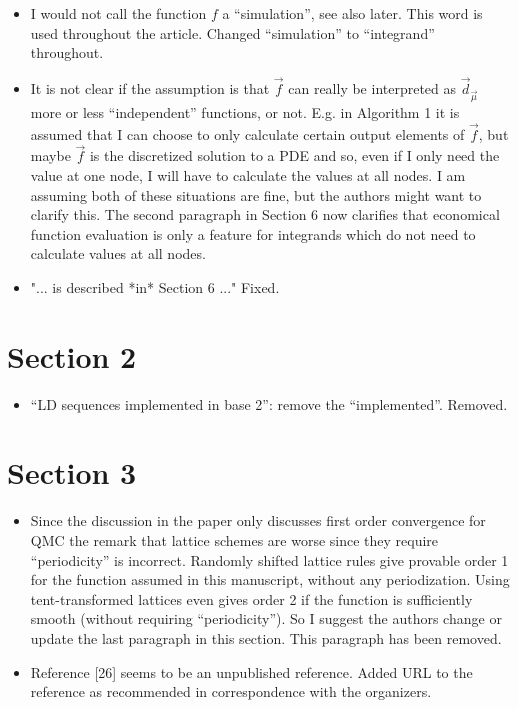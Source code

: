 \documentclass{article}[12pt]
\newcommand{\Referee}[1]{{\color{blue} #1 \newline}}
\begin{document}
\begin{itemize}
    \item \Referee{I would not call the function $f$ a ``simulation'', see also later. This word is used throughout the article.}Changed ``simulation'' to ``integrand'' throughout.
    \item \Referee{It is not clear if the assumption is that $\vec{f}$ can really be interpreted as $\vec{d}_{\vec{\mu}}$ more or less ``independent'' functions, or not. E.g. in Algorithm 1 it is assumed that I can choose to only calculate certain output elements of $\vec{f}$, but maybe $\vec{f}$ is the discretized solution to a PDE and so, even if I only need the value at one node, I will have to calculate the values at all nodes. I am assuming both of these situations are fine, but the authors might want to clarify this.}The second paragraph in Section 6 now clarifies that economical function evaluation is only a feature for integrands which do not need to calculate values at all nodes. 
    \item \Referee{"... is described *in* Section 6 ..."}Fixed. 
\end{itemize}

\section*{Section 2}

\begin{itemize}
    \item \Referee{``LD sequences implemented in base 2'': remove the ``implemented''.}Removed. 
\end{itemize}

\section*{Section 3}

\begin{itemize}
    \item \Referee{Since the discussion in the paper only discusses first order convergence for QMC the remark that lattice schemes are worse since they require ``periodicity'' is incorrect. Randomly shifted lattice rules give provable order 1 for the function assumed in this manuscript, without any periodization. Using tent-transformed lattices even gives order 2 if the function is sufficiently smooth (without requiring ``periodicity''). So I suggest the authors change or update the last paragraph in this section.}This paragraph has been removed.
    \item \Referee{Reference [26] seems to be an unpublished reference.}Added URL to the reference as recommended in correspondence with the organizers. 
\end{itemize}
\end{document}
